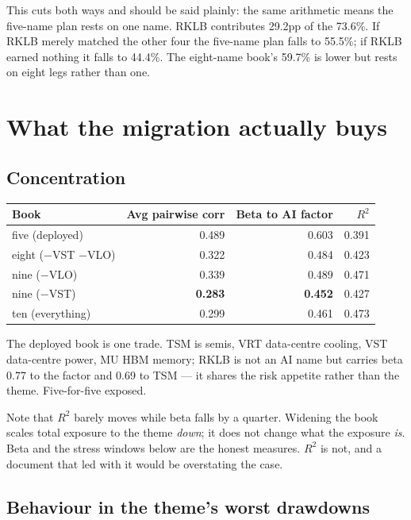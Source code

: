 \documentclass[11pt]{article}
\newcommand{\pc}[1]{#1\%}
\begin{document}
This cuts both ways and should be said plainly: the same arithmetic means the five-name plan
rests on one name. RKLB contributes 29.2pp of the \pc{73.6}. If RKLB merely matched the other
four the five-name plan falls to \pc{55.5}; if RKLB earned nothing it falls to \pc{44.4}. The
eight-name book's \pc{59.7} is lower but rests on eight legs rather than one.

\section{What the migration actually buys}

\subsection*{Concentration}

\begin{table}[H]\centering\small
\begin{tabular}{lrrr}
\toprule
\textbf{Book} & \textbf{Avg pairwise corr} & \textbf{Beta to AI factor} & \textbf{$R^2$} \\
\midrule
five (deployed)       & 0.489 & 0.603 & 0.391 \\
eight ($-$VST $-$VLO) & 0.322 & 0.484 & 0.423 \\
nine ($-$VLO)         & 0.339 & 0.489 & 0.471 \\
nine ($-$VST)         & \textbf{0.283} & \textbf{0.452} & 0.427 \\
ten (everything)      & 0.299 & 0.461 & 0.473 \\
\bottomrule
\end{tabular}
\end{table}

The deployed book is one trade. TSM is semis, VRT data-centre cooling, VST data-centre power, MU
HBM memory; RKLB is not an AI name but carries beta 0.77 to the factor and 0.69 to TSM --- it
shares the risk appetite rather than the theme. Five-for-five exposed.

Note that $R^2$ barely moves while beta falls by a quarter. Widening the book scales total
exposure to the theme \emph{down}; it does not change what the exposure \emph{is}. Beta and the
stress windows below are the honest measures. $R^2$ is not, and a document that led with it
would be overstating the case.

\subsection*{Behaviour in the theme's worst drawdowns}
\end{document}
